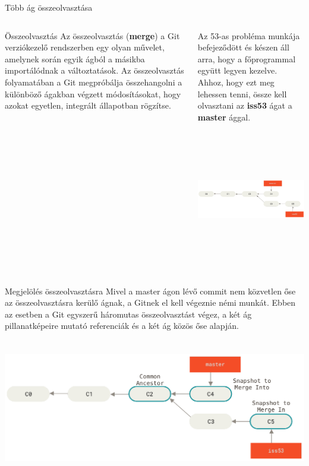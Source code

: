 \documentclass[english, aspectratio=169]{beamer}
\begin{document}
\begin{frame}{Több ág összeolvasztása}
\begin{columns}
\begin{column}{0.4\textwidth}
\begin{center}
\begin{block}{Összeolvasztás}
Az összeolvasztás (\textbf{merge}) a Git verziókezelő rendszerben egy olyan művelet, amelynek során egyik ágból a másikba importálódnak a változtatások. Az összeolvasztás folyamatában a Git megpróbálja összehangolni a különböző ágakban végzett módosításokat, hogy azokat egyetlen, integrált állapotban rögzítse.
\end{block}
\end{center}
\end{column}
\begin{column}{0.6\textwidth}
Az 53-as probléma munkája befejeződött és készen áll arra, hogy a főprogrammal együtt legyen kezelve. Ahhoz, hogy ezt meg lehessen tenni, össze kell olvasztani az \textbf{iss53} ágat a \textbf{master} ággal.
\begin{center}
\includegraphics[height=6cm, width=9cm, keepaspectratio]{images/git_12.png}
\end{center}
\end{column}
\end{columns}
\end{frame}

\begin{frame}{Megjelölés összeolvasztásra}
Mivel a master ágon lévő commit nem közvetlen őse az összeolvasztásra kerülő ágnak, a Gitnek el kell végeznie némi munkát. Ebben az esetben a Git egyszerű háromutas összeolvasztást végez, a két ág pillanatképeire mutató referenciák és a két ág közös őse alapján.
\begin{center}
\includegraphics[height=6cm, width=14cm, keepaspectratio]{images/git_13.png}
\end{center}
\end{frame}
\end{document}
